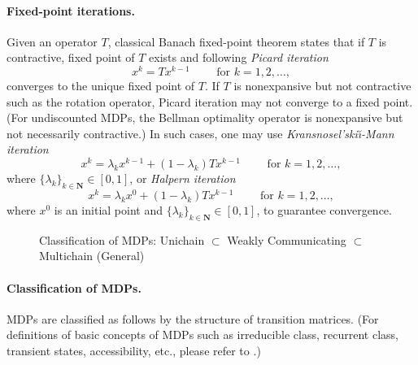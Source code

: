 \documentclass{article} %
\begin{document}
\paragraph{Fixed-point iterations.}  
Given an operator $T$, 
classical Banach fixed-point theorem \citep{banach1922operations} states that if $T$ is contractive, fixed point of $T$ exists and following \emph{Picard iteration}
\[x^{k}=Tx^{k-1}\qquad\text{ for } k=1,2,\dots,\]
converges to the unique fixed point of $T$. If $T$ is nonexpansive but not contractive such as the rotation operator, Picard iteration may not converge to a fixed point. 
(For undiscounted MDPs, the Bellman optimality operator is nonexpansive but not necessarily contractive.)
In such cases, one may use \emph{Kransnosel'ski\u\i-Mann iteration} \citep{mann1953mean, krasnosel1955two} 
\[ x^{k}=\lambda_{k} x^{k-1}+ (1-\lambda_{k}) Tx^{k-1}
\qquad\text{ for } k=1,2,\dots,\]
where $\{\lambda_k\}_{k \in \mathbf{N}} \in [0,1]$, or  \emph{Halpern iteration}  \citep{halpern1967fixed}
\[ x^{k}=\lambda_{k} x^0+ (1-\lambda_{k}) Tx^{k-1}
\qquad\text{ for } k=1,2,\dots,\]
where $x^0$ is an initial point and $\{\lambda_k\}_{k \in \mathbf{N}} \in [0,1]$, to guarantee convergence.

\begin{figure}
    \centering
{}
    \caption{Classification of MDPs:
    Unichain $\subset$ Weakly Communicating $\subset$ Multichain (General)}
    \label{fig:class_MDP}
\end{figure}

\paragraph{Classification of MDPs.}
  MDPs are classified as follows by the structure of transition matrices. (For definitions of basic concepts of MDPs such as irreducible class, recurrent class, transient states, accessibility, etc., please refer to \citet[Appendix A.2]{10.5555/528623}.)
\end{document}
